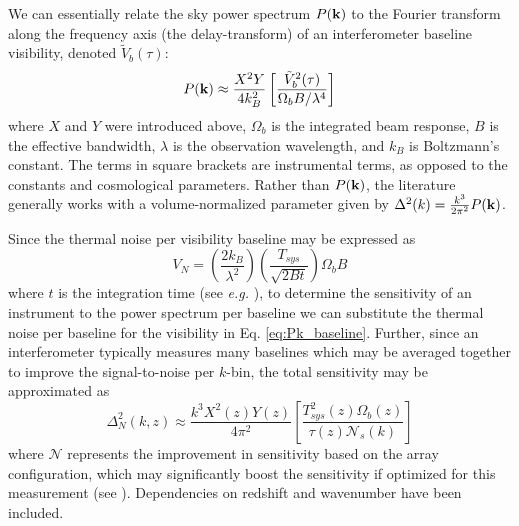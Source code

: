 \documentclass[preprint,11pt]{aastex}
\newcommand{\kvec}{{\bf k}}
\begin{document}
We can essentially relate the sky power spectrum $P(\kvec)$ to the Fourier transform along the frequency axis (the delay-transform) of an interferometer baseline visibility, denoted ${\tilde V}_b(\tau)$:
\begin{equation}
P(\kvec) \approx\frac{X^2Y}{4k_B^2}   \left[\frac{{\tilde V}^2_b(\tau)}{\Omega_b B/ \lambda^4} \right]
\label{eq:Pk_baseline}
\end{equation}
where $X$ and $Y$ were introduced above, $\Omega_b$ is the integrated beam response, $B$ is the effective bandwidth, $\lambda$ is the observation wavelength, and $k_B$ is Boltzmann's constant.  The terms in square brackets are instrumental terms, as opposed to the constants and cosmological parameters.  
Rather than $P(\kvec)$, the literature generally works with a volume-normalized parameter given by $\Delta^2(k) = \frac{k^3}{2\pi^2}P(\kvec)$.    

Since the thermal noise per visibility baseline may be expressed as
\begin{equation}
V_N = \left(\frac{2k_B}{\lambda^2}\right)\left(\frac{T_{sys}}{\sqrt{2Bt}}\right)\Omega_b B
\label{eq:sensitivity_per_baseline}
\end{equation}
where $t$ is the integration time (see {\em e.g.} \citealt{thompson_et_al2001}),
to determine the sensitivity of an instrument to the power spectrum per baseline we can substitute the thermal noise per baseline for the visibility in Eq. \ref{eq:Pk_baseline}.  Further, since an interferometer typically measures many baselines which may be averaged together to improve the signal-to-noise per $k$-bin, the total sensitivity may be approximated as
\begin{equation}
\Delta^2_N (k,z)\approx \frac{k^3X^2(z)Y(z)}{4\pi^2} \left[\frac{T_{sys}^2(z)\Omega_b(z) }{\tau(z) \mathcal{N}_s(k)}\right]
\label{eq:sensitivity}
\end{equation}
where $\mathcal{N}$ represents the improvement in sensitivity based on the array configuration, which may significantly boost the sensitivity if optimized for this measurement (see \citealt{parsons_et_al2012b}).  Dependencies on redshift and wavenumber have been included.
\end{document}
